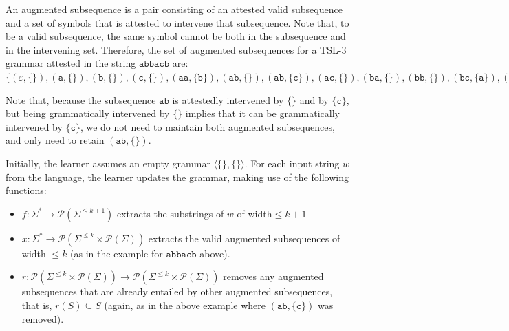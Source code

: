 \documentclass[11pt]{article}
\begin{document}
    An augmented subsequence is a pair consisting of an attested valid subsequence and a set of symbols that is attested to intervene that subsequence.
    Note that, to be a valid subsequence, the same symbol cannot be both in the subsequence and in the intervening set.
    Therefore, the set of augmented subsequences for a TSL-$3$ grammar attested in the string $\mathtt{abbacb}$ are:
    $\{
    ( \varepsilon, \{\} ), \allowbreak
    ( \mathtt{a}, \{\} ),  \allowbreak
    ( \mathtt{b}, \{\} ), \allowbreak
    ( \mathtt{c}, \{\} ), \allowbreak
    ( \mathtt{aa}, \{\mathtt{b}\} ), \allowbreak
    ( \mathtt{ab}, \{\} ), \allowbreak
    ( \mathtt{ab}, \{\mathtt{c}\} ), \allowbreak
    ( \mathtt{ac}, \{\} ), \allowbreak
    ( \mathtt{ba}, \{\} ), \allowbreak
    ( \mathtt{bb}, \{\} ), \allowbreak
    ( \mathtt{bc}, \{\mathtt{a}\} ), \allowbreak
    ( \mathtt{aac}, \{\mathtt{b}\} ), \allowbreak
    ( \mathtt{abb}, \{\} ), \allowbreak
    ( \mathtt{acb}, \{\} ), \allowbreak
    ( \mathtt{bab}, \{\mathtt{c}\} ), \allowbreak
    ( \mathtt{bac}, \{\} ), \allowbreak
    ( \mathtt{bba}, \{\} ), \allowbreak
    ( \mathtt{bbb}, \{\mathtt{a},\mathtt{c}\} ), \allowbreak
    ( \mathtt{bbc}, \{\mathtt{a}\} ), \allowbreak
    ( \mathtt{bcb}, \{\mathtt{a}\} ) \allowbreak
    \} $

    Note that, because the subsequence $\mathtt{ab}$ is attestedly intervened by $\{\}$ and by $\{\mathtt{c}\}$, but being grammatically intervened by $\{\}$ implies that it can be grammatically intervened by $\{\mathtt{c}\}$, we do not need to maintain both augmented subsequences, and only need to retain $( \mathtt{ab}, \{\} )$.

    Initially, the learner assumes an empty grammar $\langle \{\}, \{\} \rangle$. For each input string $w$ from the language, the learner updates the grammar, making use of the following functions:

    \begin{itemize}
        \item $ f : \Sigma^* \rightarrow \mathcal{P} \left( \Sigma^{\leq k+1} \right) $ extracts the  substrings of $w$ of width$ \leq k+1 $
        \item $ x : \Sigma^* \rightarrow \mathcal{P} \left( \Sigma^{\leq k} \times \mathcal{P} \left( \Sigma \right) \right) $ extracts the valid augmented subsequences of width $ \leq k$ (as in the example for $\mathtt{abbacb}$ above).
        \item $ r :  \mathcal{P} \left( \Sigma^{\leq k} \times \mathcal{P} \left( \Sigma \right) \right) \rightarrow \mathcal{P} \left( \Sigma^{\leq k} \times \mathcal{P} \left( \Sigma \right) \right)$ removes any augmented subsequences that are already entailed by other augmented subsequences, that is, $r(S) \subseteq S$ (again, as in the above example where $( \mathtt{ab}, \{\mathtt{c}\} )$ was removed).
    \end{itemize}
\end{document}
